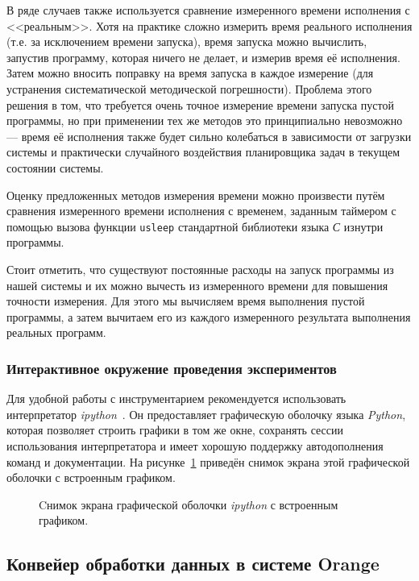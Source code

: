 В ряде случаев также используется сравнение измеренного времени исполнения с <<реальным>>. Хотя на практике сложно измерить время реального исполнения (т.е. за исключением времени запуска), время запуска можно вычислить, запустив программу, которая ничего не делает, и измерив время её исполнения. Затем можно вносить поправку на время запуска в каждое измерение (для устранения систематической методической погрешности). Проблема этого решения в том, что требуется очень точное измерение времени запуска пустой программы, но при применении тех же методов это принципиально невозможно --- время её исполнения также будет сильно колебаться в зависимости от загрузки системы и практически случайного воздействия планировщика задач в текущем состоянии системы.

Оценку предложенных методов измерения времени можно произвести путём сравнения измеренного времени исполнения с временем, заданным таймером с помощью вызова функции \texttt{usleep} стандартной библиотеки языка \textit{С} изнутри программы.

Стоит отметить, что существуют постоянные расходы на запуск программы из нашей системы и их можно вычесть из измеренного времени для повышения точности измерения. Для этого мы вычисляем время выполнения пустой программы, а затем вычитаем его из каждого измеренного результата выполнения реальных программ.


\subsubsection{Интерактивное окружение проведения экспериментов}
Для удобной работы с инструментарием рекомендуется использовать интерпретатор \textit{ipython}~\cite{ipython}. Он предоставляет графическую оболочку языка \textit{Python}, которая позволяет строить графики в том же окне, сохранять сессии использования интерпретатора и имеет хорошую поддержку автодополнения команд и документации. На рисунке~\ref{img:besselj} приведён снимок экрана этой графической оболочки с встроенным графиком.

\begin{figure}[tbp]
    \caption{Cнимок экрана графической оболочки \textit{ipython} с встроенным графиком.}
    \label{img:besselj}
\end{figure}

\subsection{Конвейер обработки данных в системе Orange}
\label{orange-pipeline}

